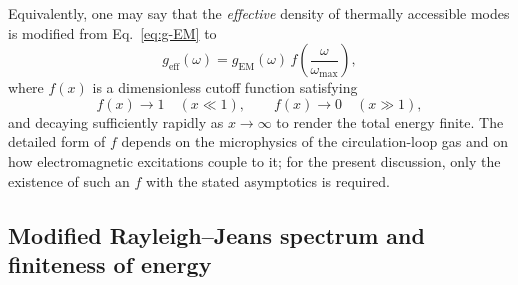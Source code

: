 \documentclass[11pt]{article}
\begin{document}
            Equivalently, one may say that the \emph{effective} density of thermally accessible
            modes is modified from Eq.~\eqref{eq:g-EM} to
            \begin{equation}
                g_{\mathrm{eff}}(\omega)
                = g_{\mathrm{EM}}(\omega)\,f\!\left(\frac{\omega}{\omega_{\max}}\right),
                \label{eq:g-eff}
            \end{equation}
            where $f(x)$ is a dimensionless cutoff function satisfying
            \begin{equation}
                f(x) \to 1 \quad (x\ll 1),
                \qquad
                f(x) \to 0 \quad (x\gg 1),
                \label{eq:f-asymptotics}
            \end{equation}
            and decaying sufficiently rapidly as $x\to\infty$ to render the total energy finite.
            The detailed form of $f$ depends on the microphysics of the circulation-loop gas
            and on how electromagnetic excitations couple to it; for the present discussion,
            only the existence of such an $f$ with the stated asymptotics is required.

        \subsection{Modified Rayleigh--Jeans spectrum and finiteness of energy}
\end{document}
